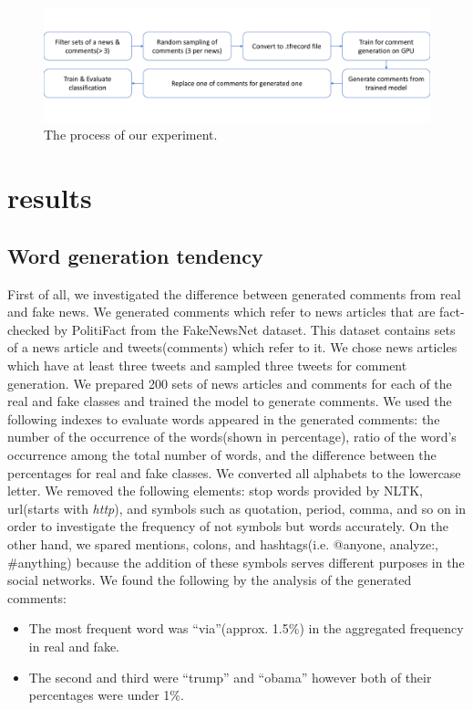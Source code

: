\documentclass[conference]{IEEEtran}
\begin{document}
\begin{figure}[!t]
    \centering
    \includegraphics[width=0.8\linewidth,pagebox=cropbox,clip]{fig_process.pdf}
    \caption{The process of our experiment.}
    \label{fig:process}
\end{figure}


\section{results}
\subsection{Word generation tendency}
\label{subsec:trend}
First of all, we investigated the difference between generated comments from real and fake news.
We generated comments which refer to news articles that are fact-checked by PolitiFact from the FakeNewsNet dataset\cite{Shu2018FakeNewsNetAD}.
This dataset contains sets of a news article and tweets(comments) which refer to it.
We chose news articles which have at least three tweets and sampled three tweets for comment generation.
We prepared 200 sets of news articles and comments for each of the real and fake classes and trained the model to generate comments.
We used the following indexes to evaluate words appeared in the generated comments:
the number of the occurrence of the words(shown in percentage),
ratio of the word's occurrence among the total number of words,
and the difference between the percentages for real and fake classes.
We converted all alphabets to the lowercase letter.
We removed the following elements: stop words provided by NLTK\cite{bird-loper-2004-nltk}, 
url(starts with \textit{http}),
 and symbols such as quotation, period, comma, and so on in order to investigate the frequency of not symbols but words accurately.
On the other hand, we spared mentions, colons, and hashtags(i.e. @anyone, analyze:, \#anything)
 because the addition of these symbols serves different purposes in the social networks.
We found the following by the analysis of the generated comments:
\begin{itemize}[]
    \item The most frequent word was ``via''(approx. 1.5\%) in the aggregated frequency in real and fake.  
    \item The second and third were ``trump'' and ``obama'' however both of their percentages were under 1\%.
\end{itemize}
\end{document}

